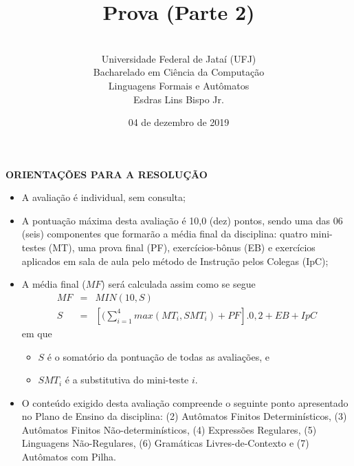 \documentclass[12pt,a4paper,oneside]{article}
\author{\\Universidade Federal de Jataí (UFJ)\\Bacharelado em Ciência da Computação \\Linguagens Formais e Autômatos \\Esdras Lins Bispo Jr.}
\date{04 de dezembro de 2019}
\title{\sc \huge Prova (Parte 2)}
\begin{document}
\maketitle

{\bf ORIENTAÇÕES PARA A RESOLUÇÃO}

\small
 
\begin{itemize}
	\item A avaliação é individual, sem consulta;
	\item A pontuação máxima desta avaliação é 10,0 (dez) pontos, sendo uma das 06 (seis) componentes que formarão a média final da disciplina: quatro mini-testes (MT), uma prova final (PF), exercícios-bônus (EB) e exercícios aplicados em sala de aula pelo método de Instrução pelos Colegas (IpC);
	\item A média final ($MF$) será calculada assim como se segue
	\begin{eqnarray}
		MF & = & MIN(10, S) \nonumber \\
		S & = & [(\sum_{i=1}^{4} max(MT_i, SMT_i ) + PF].0,2  + EB + IpC\nonumber
	\end{eqnarray}
	em que 
	\begin{itemize}
		\item $S$ é o somatório da pontuação de todas as avaliações, e
		\item $SMT_i$ é a substitutiva do mini-teste $i$.
	\end{itemize}
	\item O conteúdo exigido desta avaliação compreende o seguinte ponto apresentado no Plano de Ensino da disciplina: (2) Autômatos Finitos Determinísticos,
	(3) Autômatos Finitos Não-determinísticos, (4) Expressões Regulares, (5) Linguagens Não-Regulares, (6) Gramáticas Livres-de-Contexto e (7) Autômatos com Pilha.
\end{itemize}

\begin{center}
\end{center}

\newpage
\end{document}
